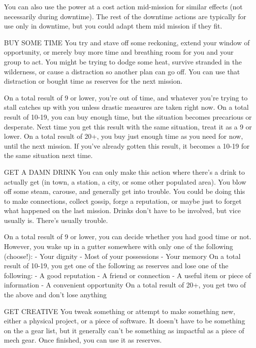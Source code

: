 You can also use the power at a cost action mid-mission for similar effects (not necessarily  
during downtime). The rest of the downtime actions are typically for use only in downtime, but  
you could adapt them mid mission if they fit.
 

BUY SOME TIME  
You try and stave off some reckoning, extend your window of opportunity, or merely buy more  
time and breathing room for you and your group to act. You might be trying to dodge some heat,  
survive stranded in the wilderness, or cause a distraction so another plan can go off. You can use  
that distraction or bought time as reserves for the next mission.  

On a total result of 9 or lower, you’re out of time, and whatever you’re trying to stall catches up  
with you unless drastic measures are taken right now.  
On a total result of 10-19, you can buy enough time, but the situation becomes precarious or  
desperate. Next time you get this result with the same situation, treat it as a 9 or lower.  
On a total result of 20+, you buy just enough time as you need for now, until the next mission. If  
you’ve already gotten this result, it becomes a 10-19 for the same situation next time.  

GET A DAMN DRINK  
You can only make this action where there’s a drink to actually get (in town, a station, a city, or  
some other populated area). You blow off some steam, carouse, and generally get into trouble.  
You could be doing this to make connections, collect gossip, forge a reputation, or maybe just to  
forget what happened on the last mission. Drinks don’t have to be involved, but vice usually is.  
There’s usually trouble.  

On a total result of 9 or lower, you can decide whether you had good time or not. However, you  
wake up in a gutter somewhere with only one of the following (choose!):  
    -    Your dignity  
    -    Most of your possessions  
    -    Your memory  
On a total result of 10-19, you get one of the following as reserves and lose one of the following:  
    -    A good reputation  
    -    A friend or connection  
    -    A useful item or piece of information  
    -    A convenient opportunity  
On a total result of 20+, you get two of the above and don’t lose anything  

GET CREATIVE  
You tweak something or attempt to make something new, either a physical project, or a piece of  
software. It doesn’t have to be something on the a gear list, but it generally can’t be something as  
impactful as a piece of mech gear. Once finished, you can use it as reserves.  

